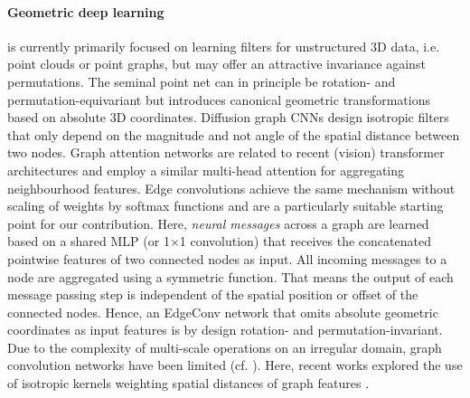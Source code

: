         \paragraph{Geometric deep learning} \cite{bronstein2017geometric} is currently primarily focused on learning filters for unstructured 3D data, i.e. point clouds or point graphs, but may offer an attractive invariance against permutations. The seminal point net \cite{qi2017pointnet} can in principle be rotation- and permutation-equivariant but introduces canonical geometric transformations based on absolute 3D coordinates. Diffusion graph CNNs \cite{atwood2016diffusion} design isotropic filters that only depend on the magnitude and not angle of the spatial distance between two nodes. Graph attention networks \cite{velivckovic2018graph} are related to recent (vision) transformer architectures and employ a similar multi-head attention for aggregating neighbourhood features. Edge convolutions \cite{wang2019dynamic} achieve the same mechanism without scaling of weights by softmax functions and are a particularly suitable starting point for our contribution. Here, \textit{neural messages} across a graph are learned based on a shared MLP (or 1$\times$1 convolution) that receives the concatenated pointwise features of two connected nodes as input. All incoming messages to a node are aggregated using a symmetric function.
        That means the output of each message passing step is independent of the spatial position or offset of the connected nodes. Hence, an EdgeConv network that omits absolute geometric coordinates as input features is by design rotation- and permutation-invariant.
        Due to the complexity of multi-scale operations on an irregular domain, graph convolution networks have been limited
        (cf. \cite{qi2017pointnet++}). Here, recent works explored the use of isotropic kernels weighting  spatial distances of graph features \cite{schutt2017schnet}.

